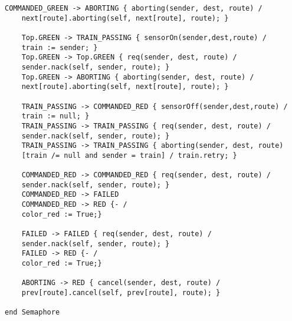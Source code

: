 \begin{lstlisting}[caption={modello della classe Switch}]
    COMMANDED_GREEN -> ABORTING { aborting(sender, dest, route) / 
    next[route].aborting(self, next[route], route); }

    Top.GREEN -> TRAIN_PASSING { sensorOn(sender,dest,route) / 
    train := sender; }
    Top.GREEN -> Top.GREEN { req(sender, dest, route) / 
    sender.nack(self, sender, route); }
    Top.GREEN -> ABORTING { aborting(sender, dest, route) / 
    next[route].aborting(self, next[route], route); }

    TRAIN_PASSING -> COMMANDED_RED { sensorOff(sender,dest,route) / 
    train := null; }
    TRAIN_PASSING -> TRAIN_PASSING { req(sender, dest, route) / 
    sender.nack(self, sender, route); }
    TRAIN_PASSING -> TRAIN_PASSING { aborting(sender, dest, route) 
    [train /= null and sender = train] / train.retry; }
 
    COMMANDED_RED -> COMMANDED_RED { req(sender, dest, route) / 
    sender.nack(self, sender, route); }
    COMMANDED_RED -> FAILED
    COMMANDED_RED -> RED {- / 
    color_red := True;}
    
    FAILED -> FAILED { req(sender, dest, route) / 
    sender.nack(self, sender, route); }
    FAILED -> RED {- / 
    color_red := True;}

    ABORTING -> RED { cancel(sender, dest, route) / 
    prev[route].cancel(self, prev[route], route); }

end Semaphore
\end{lstlisting}

